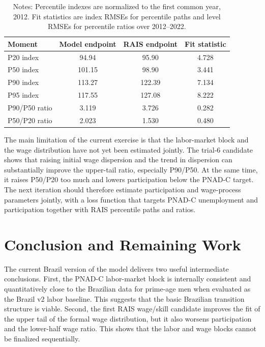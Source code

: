 \documentclass[12pt]{article}
\begin{document}
	\begin{table}[H]
		\centering
		\caption{RAIS Wage Fit: Full Trial-6 Candidate}
		\label{tab:rais-wage-fit-trial6}
		\small
		\begin{tabular}{lccc}
			\toprule
			Moment & Model endpoint & RAIS endpoint & Fit statistic \\
			\midrule
			P20 index & 94.94 & 95.90 & 4.728 \\
			P50 index & 101.15 & 98.90 & 3.441 \\
			P90 index & 113.27 & 122.39 & 7.134 \\
			P95 index & 117.55 & 127.08 & 8.222 \\
			P90/P50 ratio & 3.119 & 3.726 & 0.282 \\
			P50/P20 ratio & 2.023 & 1.530 & 0.480 \\
			\bottomrule
		\end{tabular}
		\caption*{Notes: Percentile indexes are normalized to the first common year, 2012. Fit statistics are index RMSEs for percentile paths and level RMSEs for percentile ratios over 2012--2022.}
	\end{table}

	The main limitation of the current exercise is that the labor-market block and the wage distribution have not yet been estimated jointly. The trial-6 candidate shows that raising initial wage dispersion and the trend in dispersion can substantially improve the upper-tail ratio, especially P90/P50. At the same time, it raises P50/P20 too much and lowers participation below the PNAD-C target. The next iteration should therefore estimate participation and wage-process parameters jointly, with a loss function that targets PNAD-C unemployment and participation together with RAIS percentile paths and ratios.

	\section{Conclusion and Remaining Work} \label{sec:conclusion}

	The current Brazil version of the model delivers two useful intermediate conclusions. First, the PNAD-C labor-market block is internally consistent and quantitatively close to the Brazilian data for prime-age men when evaluated as the Brazil v2 labor baseline. This suggests that the basic Brazilian transition structure is viable. Second, the first RAIS wage/skill candidate improves the fit of the upper tail of the formal wage distribution, but it also worsens participation and the lower-half wage ratio. This shows that the labor and wage blocks cannot be finalized sequentially.
\end{document}
